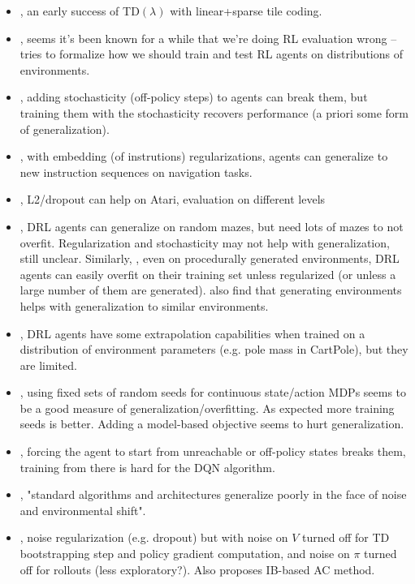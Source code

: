 \begin{itemize}
    \item \citet{sutton1996generalization}, an early success of TD$(\lambda)$ with linear+sparse tile coding.
    \item \citet{whiteson2011protecting}, seems it's been known for a while that we're doing RL evaluation wrong -- tries to formalize how we should train and test RL agents on distributions of environments.
    \item \citet{machado2018revisiting}, adding stochasticity (off-policy steps) to agents can break them, but training them with the stochasticity recovers performance (a priori some form of generalization).
    \item \citet{oh2017zero}, with embedding (of instrutions) regularizations, agents can generalize to new instruction sequences on navigation tasks.
    \item \citet{farebrother2018generalization}, L2/dropout can help on Atari, evaluation on different levels
    \item \citet{zhang2018study}, DRL agents can generalize on random mazes, but need lots of mazes to not overfit. Regularization and stochasticity may not help with generalization, still unclear. Similarly, \citet{cobbe2018quantifying}, even on procedurally generated environments, DRL agents can easily overfit on their training set unless regularized (or unless a large number of them are generated). \citet{justesen2018illuminating} also find that generating environments helps with generalization to similar environments.
    \item \citet{packer2018assessing},  DRL agents have some extrapolation capabilities when trained on a distribution of environment parameters (e.g. pole mass in CartPole), but they are limited.
    \item \citet{zhang2018dissection}, using fixed sets of random seeds for continuous state/action MDPs seems to be a good measure of generalization/overfitting. As expected more training seeds is better. Adding a model-based objective seems to hurt generalization.
    \item \citet{witty2018measuring}, forcing the agent to start from unreachable or off-policy states breaks them, training from there is hard for the DQN algorithm.
    \item \citet{zhao2019investigating}, "standard algorithms and architectures generalize poorly in the face of noise and environmental shift".
    \item \citet{igl2019generalization}, noise regularization (e.g. dropout) but with noise on $V$ turned off for TD bootstrapping step and policy gradient computation, and noise on $\pi$ turned off for rollouts (less exploratory?). Also proposes IB-based AC method.

\end{itemize}
